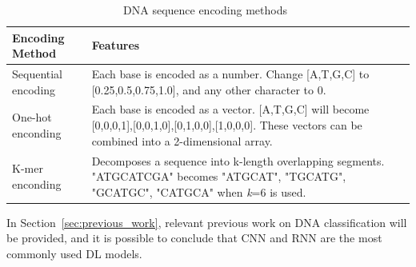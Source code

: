 \begin{table}[ht]
	\caption{DNA sequence encoding methods~\cite{Yang2020ReviewDNA}}
	\label{tab:encoding_methods}
\centering
\begin{tabular}{lp{8cm}}
	\toprule
	\textbf{Encoding Method} & \textbf{Features} \\
	\midrule
	
	Sequential encoding & Each base is encoded as a number. Change [A,T,G,C] to [0.25,0.5,0.75,1.0], and any other character to 0.\\\midrule
	
    One-hot enconding & Each base is encoded as a vector. [A,T,G,C] will become [0,0,0,1],[0,0,1,0],[0,1,0,0],[1,0,0,0]. These vectors can be combined into a 2-dimensional array.\\\midrule
    
    K-mer enconding & Decomposes a sequence into k-length overlapping segments. "ATGCATCGA" becomes "ATGCAT", "TGCATG", "GCATGC", "CATGCA"  when \textit{k}=6 is used.\\
    
	\bottomrule
\end{tabular}
\end{table}

In Section~\ref{sec:previous_work}, relevant previous work on DNA classification will be provided, and it is possible to conclude that \gls{CNN} and \gls{RNN} are the most commonly used \gls{DL} models.

